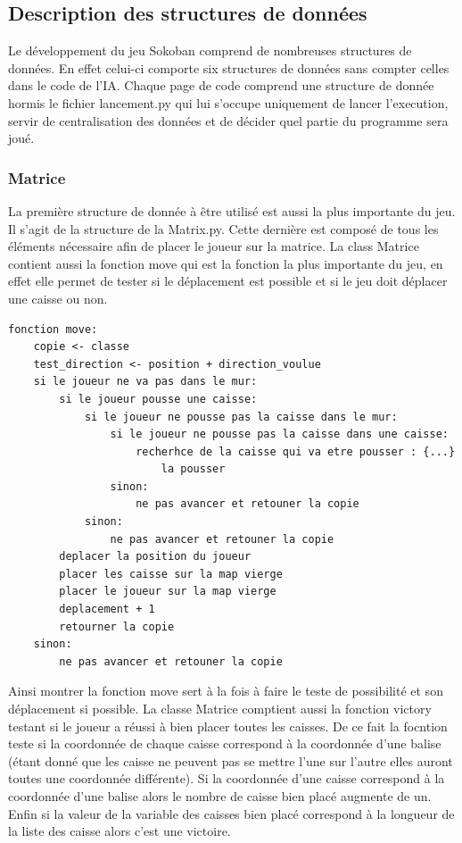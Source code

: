 \documentclass[a4paper,12pt]{article} %
\begin{document}
\subsection{Description des structures de données}

Le développement du jeu Sokoban comprend de nombreuses structures de données.
En effet celui-ci comporte six structures de données sans compter celles dans le code de l'IA.
Chaque page de code comprend une structure de donnée hormis le fichier lancement.py qui lui s'occupe uniquement de lancer l'execution, servir de centralisation des données et de décider quel partie du programme sera joué.

\subsubsection{Matrice}

La première structure de donnée à être utilisé est aussi la plus importante du jeu.
Il s'agit de la structure de la Matrix.py.
Cette dernière est composé de tous les éléments nécessaire afin de placer le joueur sur la matrice.
La class Matrice contient aussi la fonction move qui est la fonction la plus importante du jeu, en effet elle permet de tester si le déplacement est possible et si le jeu doit déplacer une caisse ou non.

\begin{lstlisting}
fonction move:
    copie <- classe
    test_direction <- position + direction_voulue
    si le joueur ne va pas dans le mur:
        si le joueur pousse une caisse:
            si le joueur ne pousse pas la caisse dans le mur:
                si le joueur ne pousse pas la caisse dans une caisse:
                    recherhce de la caisse qui va etre pousser : {...}
                        la pousser
                sinon:
                    ne pas avancer et retouner la copie
            sinon:
                ne pas avancer et retouner la copie
        deplacer la position du joueur
        placer les caisse sur la map vierge
        placer le joueur sur la map vierge
        deplacement + 1
        retourner la copie
    sinon:
        ne pas avancer et retouner la copie
\end{lstlisting}

Ainsi montrer la fonction move sert à la fois à faire le teste de possibilité et son déplacement si possible.
La classe Matrice comptient aussi la fonction victory testant si le joueur a réussi à bien placer toutes les caisses.
De ce fait la focntion teste si la coordonnée de chaque caisse correspond à la coordonnée d'une balise (étant donné que les caisse ne peuvent pas se mettre l'une sur l'autre elles auront toutes une coordonnée différente).
Si la coordonnée d'une caisse correspond à la coordonnée d'une balise alors le nombre de caisse bien placé augmente de un.
Enfin si la valeur de la variable des caisses bien placé correspond à la longueur de la liste des caisse alors c'est une victoire.
\end{document}
